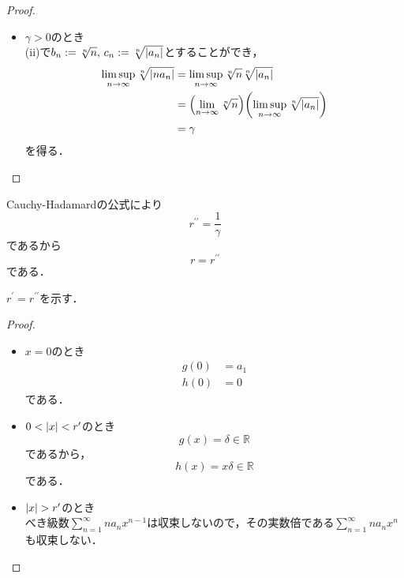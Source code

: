 \begin{enumerate}[(1)]
\begin{enumerate}[(i)]
\begin{proof}
\begin{itemize}
                \item $\gamma>0$のとき\\
                (ii)で$b_n:=\sqrt[n]{n},\, c_n:=\sqrt[n]{\abs{a_n}}$とすることができ，
                \begin{align}
                    \limsup_{n\to\infty}\sqrt[n]{\abs{na_n}}
                    &=\limsup_{n\to\infty}\sqrt[n]{n}\sqrt[n]{\abs{a_n}}\\
                    &=\qty(\lim_{n\to\infty}\sqrt[n]{n}) \qty(\limsup_{n\to\infty}\sqrt[n]{\abs{a_n}})\\
                    &=\gamma
                \end{align}
                を得る．
            \end{itemize}
        \end{proof}
        Cauchy-Hadamardの公式により
        \begin{equation}
            r^{\prime\prime}=\frac{1}{\gamma}\label{eq:last_1}
        \end{equation}
        であるから
        \begin{equation}
            r=r^{\prime\prime}
        \end{equation}
        である．
        
        $r^\prime=r^{\prime\prime}$を示す．
        \begin{proof}
            \begin{itemize}
                \item $x=0$のとき
                \begin{align}
                    g(0)&=a_1\\
                    h(0)&=0
                \end{align}
                である．
                \item $0<\abs{x}<r^\prime$のとき
                \begin{equation}
                    g(x)=\delta\in\mathbb{R}
                \end{equation}
                であるから，
                \begin{equation}
                    h(x)=x\delta\in\mathbb{R}
                \end{equation}
                である．
                \item $\abs{x}>r^\prime$のとき\\
                べき級数$\displaystyle\sum_{n=1}^\infty na_nx^{n-1}$は収束しないので，その実数倍である$\displaystyle\sum_{n=1}^\infty na_nx^{n}$も収束しない．


\end{itemize}
\end{proof}
\end{enumerate}
\end{enumerate}
